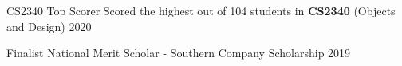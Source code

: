 




\begin{cvhonors}


\cvhonor
{CS2340 Top Scorer} %
{Scored the highest out of 104 students in \textbf{CS2340} (Objects and Design)} %
{} %
{2020} %

\cvhonor
{Finalist} %
{National Merit Scholar - Southern Company Scholarship} %
{} %
{2019} %






\end{cvhonors}






